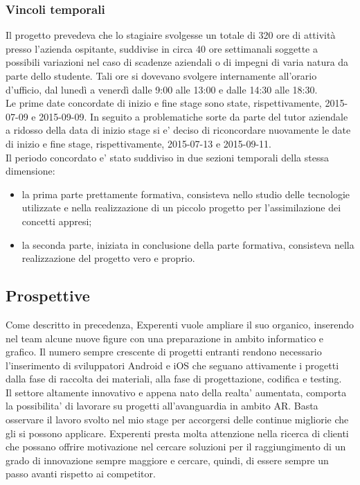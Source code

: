 \subsubsection{Vincoli temporali}
Il progetto prevedeva che lo stagiaire svolgesse un totale di 320 ore di attività presso l’azienda ospitante, suddivise in circa 40 ore settimanali soggette a possibili variazioni nel caso di scadenze aziendali o di impegni di varia natura da parte dello studente. Tali ore si dovevano svolgere internamente all’orario d’ufficio, dal lunedì a venerdì dalle 9:00 alle 13:00 e dalle 14:30 alle 18:30.
\\
Le prime date concordate di inizio e fine stage sono state, rispettivamente, 2015-07-09 e 2015-09-09. In seguito a problematiche sorte da parte del tutor aziendale a ridosso della data di inizio stage si e' deciso di riconcordare nuovamente le date di inizio e fine stage, rispettivamente, 2015-07-13 e 2015-09-11. 
\\
Il periodo concordato e' stato suddiviso in due sezioni temporali della stessa dimensione:
\begin{itemize}
	\item la prima parte prettamente formativa, consisteva nello studio delle tecnologie utilizzate e nella realizzazione di un piccolo progetto per l'assimilazione dei concetti appresi;
	\item la seconda parte, iniziata in conclusione della parte formativa, consisteva nella realizzazione del progetto vero e proprio.
\end{itemize}

\subsection{Prospettive}
Come descritto in precedenza, Experenti vuole ampliare il suo organico, inserendo nel team alcune nuove figure con una preparazione in ambito informatico e grafico. Il numero sempre crescente di progetti entranti rendono necessario l'inserimento di sviluppatori Android e iOS che seguano attivamente i progetti dalla fase di raccolta dei materiali, alla fase di progettazione, codifica e testing.
\\
Il settore altamente innovativo e appena nato della realta' aumentata, comporta la possibilita' di lavorare su progetti all'avanguardia in ambito AR. Basta osservare il lavoro svolto nel mio stage per accorgersi delle continue migliorie che gli si possono applicare. Experenti presta molta attenzione nella ricerca di clienti che possano offrire motivazione nel cercare soluzioni per il raggiungimento di un grado di innovazione sempre maggiore e cercare, quindi, di essere sempre un passo avanti rispetto ai competitor.
